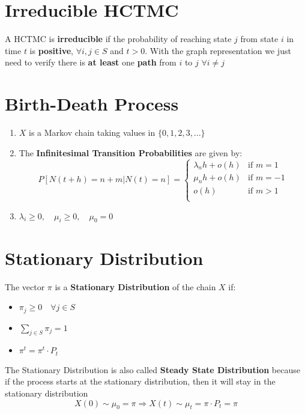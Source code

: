 \section{Irreducible HCTMC}
\begin{tcolorbox}
    A HCTMC is \textbf{irreducible} if the probability of reaching state $j$ from state $i$ in time $t$ is \textbf{positive}, $\forall i,j \in S$ and $ t > 0$. With the graph representation we just need to verify there is \textbf{at least} one \textbf{path} from $i$ to $j$ $\forall i \neq j$
\end{tcolorbox}

\newpage
\section{Birth-Death Process}
\begin{enumerate}
    \item $X$ is a Markov chain taking values in $\{0,1,2,3,...\}$
    \item The \textbf{Infinitesimal Transition Probabilities} are given by:
    $$
    P[N(t+h) = n+m | N(t) = n] = \begin{cases}
        \lambda_n h + o(h) & \mbox{if } m = 1\\
        \mu_n h + o(h) & \mbox{if } m = -1\\
        o(h) & \mbox{if } m > 1\\
    \end{cases}
    $$
    \item $\lambda_i \geq 0, \quad \mu_i \geq 0, \quad \mu_0 = 0$
\end{enumerate}

\section{Stationary Distribution}
\begin{tcolorbox}
The vector $\pi$ is a \textbf{Stationary Distribution} of the chain $X$ if:
\begin{itemize}
    \item $\pi_j \geq 0 \quad \forall j \in S$
    \item $\sum_{j \in S} \pi_j = 1$
    \item $\pi^t = \pi^t \cdot P_t$
\end{itemize}
\end{tcolorbox}
The Stationary Distribution is also called \textbf{Steady State Distribution} because if the process starts at the stationary distribution, then it will stay in the stationary distribution
$$X(0) \sim \mu_0 = \pi \Rightarrow X(t) \sim \mu_t = \pi \cdot P_t = \pi$$

